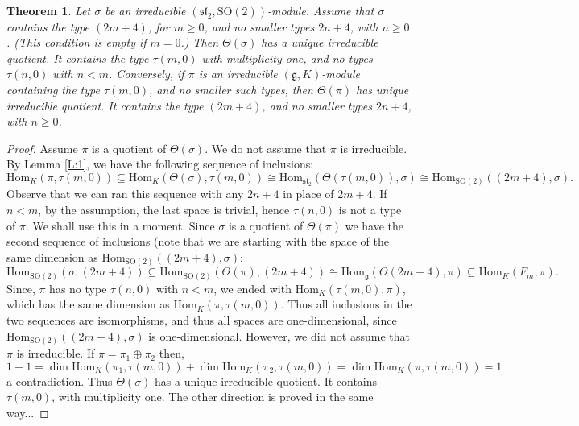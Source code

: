 \documentclass[10pt,a4paper]{amsart}
\newtheorem{thm}{Theorem}
\newcommand{\Hom}{{\mathrm{Hom}}}
\newcommand{\SO}{{\mathrm{SO}}}
\begin{document}
\begin{thm} Let $\sigma$ be an irreducible $(\mathfrak{sl}_2,\SO(2))$-module. Assume that $\sigma$ contains the type $(2m+4)$, for $m\geq 0$, and no smaller types $2n+4$, with $n\geq 0$. 
 (This condition is empty if $m=0$.) Then $\Theta(\sigma)$ has a unique irreducible quotient. It contains the type $\tau(m,0)$ with multiplicity one, and no types $\tau(n,0)$ with $n<m$. 
Conversely, if $\pi$ is an irreducible $(\mathfrak g,K)$-module containing the type $\tau(m,0)$, and 
no smaller such types, then $\Theta(\pi)$ has unique irreducible quotient. It contains the type $(2m+4)$, and no smaller types $2n+4$, with $n\geq 0$. 
\end{thm} 

\begin{proof}  Assume $\pi$ is a quotient of $\Theta(\sigma)$. We do not assume that $\pi$ is irreducible. By Lemma \ref{L:1}, we have the following sequence of inclusions: 
\[ 
\Hom_K(\pi, \tau(m,0)) \subseteq \Hom_K(\Theta(\sigma), \tau(m,0))  \cong \Hom_{\mathfrak{sl}_2} (\Theta(\tau(m,0)), \sigma) \cong \Hom_{\SO(2)} ((2m+4) , \sigma). 
\] 
Observe that we can ran this sequence with any $2n+4$ in place of $2m+4$. If $n<m$, by the assumption, the last space is trivial, hence $\tau(n,0)$ is not a type of 
$\pi$. We shall use this in a moment. 
Since $\sigma$ is a quotient of $\Theta(\pi)$ we have the second sequence of inclusions (note that we are starting with the space of the same dimension as 
$\Hom_{\SO(2)} ((2m+4) , \sigma)$: 
\[ 
\Hom_{\SO(2)}(\sigma, (2m+4)) \subseteq \Hom_{\SO(2)}(\Theta(\pi), (2m+4))  \cong \Hom_{\mathfrak g} (\Theta(2m+4), \pi) \subseteq  \Hom_{K} (F_m , \pi). 
\] 
Since, $\pi$ has no type $\tau(n,0)$ with $n<m$, we ended with  $\Hom_{K} (\tau(m,0) , \pi)$, which has  the same dimension as $\Hom_K(\pi, \tau(m,0))$. 
Thus all inclusions in the two sequences  are isomorphisms, and thus all spaces are one-dimensional, since $\Hom_{\SO(2)} ((2m+4) , \sigma)$ is one-dimensional. 
However, we did not assume that $\pi$ is irreducible. If $\pi=\pi_1\oplus \pi_2$ then, 
\[ 
1+1 = \dim \Hom_{K}(\pi_1,   \tau(m,0)) + \dim\Hom_{K}(\pi_2,  \tau(m,0)) = \dim  \Hom_{K}(\pi, \tau(m,0))=1
\] 
a contradiction. Thus $\Theta(\sigma)$ has a unique irreducible quotient. It contains $\tau(m,0)$, with multiplicity one.  The other direction is proved in the same way... 
\end{proof} 
\end{document}
